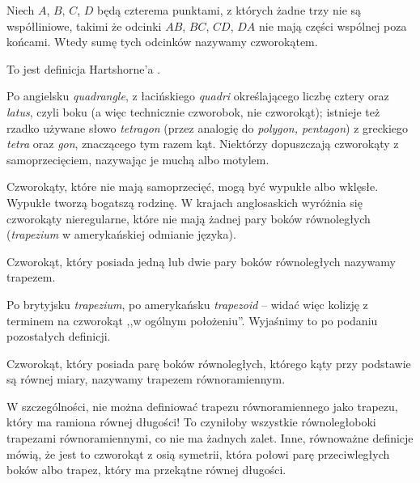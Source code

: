 %

\begin{definition}[czworokąt]
    Niech $A$, $B$, $C$, $D$ będą czterema punktami, z których żadne trzy nie są współliniowe, takimi że odcinki $AB$, $BC$, $CD$, $DA$ nie mają części wspólnej poza końcami.
    Wtedy sumę tych odcinków nazywamy czworokątem.
\end{definition}


To jest definicja Hartshorne'a \cite[s. 80]{hartshorne2000}.

Po angielsku \emph{quadrangle}, z łacińskiego \emph{quadri} określającego liczbę cztery oraz \emph{latus}, czyli boku (a więc technicznie czworobok, nie czworokąt); istnieje też rzadko używane słowo \emph{tetragon} (przez analogię do \emph{polygon, pentagon}) z greckiego \emph{tetra} oraz \emph{gon}, znaczącego tym razem kąt.
Niektórzy dopuszczają czworokąty z samoprzecięciem, nazywając je muchą albo motylem.

Czworokąty, które nie mają samoprzecięć, mogą być wypukłe albo wklęsłe.
Wypukłe tworzą bogatszą rodzinę.
W krajach anglosaskich wyróżnia się czworokąty nieregularne, które nie mają żadnej pary boków równoległych (\emph{trapezium} w amerykańskiej odmianie języka).

\begin{definition}[trapez]
	Czworokąt, który posiada jedną lub dwie pary boków równoległych nazywamy trapezem.
\end{definition}

Po brytyjsku \emph{trapezium}, po amerykańsku \emph{trapezoid} -- widać więc kolizję z terminem na czworokąt ,,w ogólnym położeniu''.
Wyjaśnimy to po podaniu pozostałych definicji.

\begin{definition}
	Czworokąt, który posiada parę boków równoległych, którego kąty przy podstawie są równej miary, nazywamy trapezem równoramiennym.
\end{definition}

W szczególności, nie można definiować trapezu równoramiennego jako trapezu, który ma ramiona równej długości!
To czyniłoby wszystkie równoległoboki trapezami równoramiennymi, co nie ma żadnych zalet.
%
Inne, równoważne definicje mówią, że jest to czworokąt z osią symetrii, która połowi parę przeciwległych boków albo trapez, który ma przekątne równej długości.

